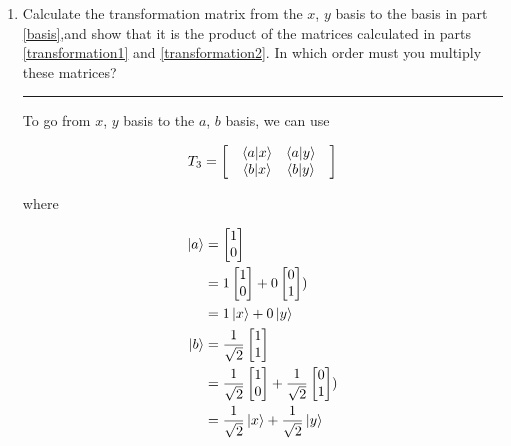 \documentclass[12pt, oneside]{article}
\newenvironment{answer}
  {\vspace*{0.2cm} \rule{12cm}{0.02cm} \vspace*{0.2cm}}
  {\vspace*{0.2cm}}
\begin{document}
\begin{enumerate}
\begin{enumerate}
\begin{answer}
    \end{answer}

    \item Calculate the transformation matrix from the $x$, $y$ basis to the basis in part \ref{basis},and show that it is the product of the matrices calculated in parts \ref{transformation1} and \ref{transformation2}. In which order must you multiply these matrices?

    \begin{answer}
      To go from $x$, $y$ basis to the $a$, $b$ basis, we can use

      \begin{align*}
        T_3 = \begin{bmatrix}
                &\bra{a}\ket{x} &\bra{a}\ket{y} &\\
                &\bra{b}\ket{x} &\bra{b}\ket{y} &
              \end{bmatrix}
      \end{align*}

      where

      \begin{align*}
        \ket{a} &= \begin{bmatrix}1 \\  0\end{bmatrix} \\
                &= 1\begin{bmatrix}1 \\  0\end{bmatrix} + 0\begin{bmatrix}0 \\ 1\end{bmatrix})\\
                &= 1\ket{x} + 0\ket{y}\\
        \ket{b} &= \frac{1}{\sqrt{2}}\begin{bmatrix}1 \\  1\end{bmatrix}\\
                &= \frac{1}{\sqrt{2}}\begin{bmatrix}1 \\  0\end{bmatrix} + \frac{1}{\sqrt{2}}\begin{bmatrix}0 \\  1\end{bmatrix})\\
                &= \frac{1}{\sqrt{2}}\ket{x} + \frac{1}{\sqrt{2}}\ket{y}
      \end{align*}


\end{answer}
\end{enumerate}
\end{enumerate}
\end{document}
